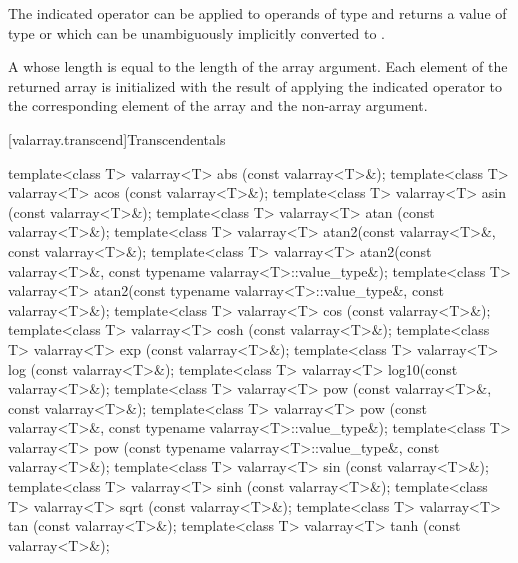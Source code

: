 \begin{itemdescr}
\pnum
\mandates
The indicated operator can be applied to operands of type  and returns
a value of type  or which can be unambiguously
implicitly converted to .

\pnum
\returns
A  whose
length is equal to the length of the array argument.
Each element
of the returned array is initialized with the result of applying the
indicated operator to the corresponding element of the array and the non-array argument.
\end{itemdescr}

[valarray.transcend]{Transcendentals}

%
%
%
%
%
%
%
%
%
%
%
%
%
%
%
%
\begin{itemdecl}
template<class T> valarray<T> abs  (const valarray<T>&);
template<class T> valarray<T> acos (const valarray<T>&);
template<class T> valarray<T> asin (const valarray<T>&);
template<class T> valarray<T> atan (const valarray<T>&);
template<class T> valarray<T> atan2(const valarray<T>&, const valarray<T>&);
template<class T> valarray<T> atan2(const valarray<T>&, const typename valarray<T>::value_type&);
template<class T> valarray<T> atan2(const typename valarray<T>::value_type&, const valarray<T>&);
template<class T> valarray<T> cos  (const valarray<T>&);
template<class T> valarray<T> cosh (const valarray<T>&);
template<class T> valarray<T> exp  (const valarray<T>&);
template<class T> valarray<T> log  (const valarray<T>&);
template<class T> valarray<T> log10(const valarray<T>&);
template<class T> valarray<T> pow  (const valarray<T>&, const valarray<T>&);
template<class T> valarray<T> pow  (const valarray<T>&, const typename valarray<T>::value_type&);
template<class T> valarray<T> pow  (const typename valarray<T>::value_type&, const valarray<T>&);
template<class T> valarray<T> sin  (const valarray<T>&);
template<class T> valarray<T> sinh (const valarray<T>&);
template<class T> valarray<T> sqrt (const valarray<T>&);
template<class T> valarray<T> tan  (const valarray<T>&);
template<class T> valarray<T> tanh (const valarray<T>&);
\end{itemdecl}

